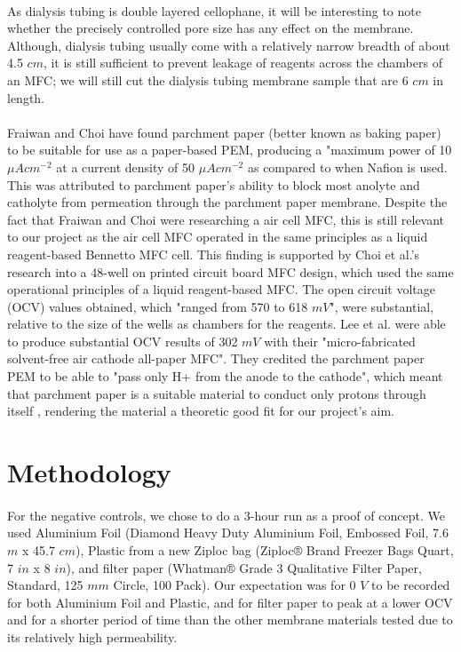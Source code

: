 \documentclass[12pt, twocolumn, a4paper]{article}
\begin{document}
    \paragraph{}As dialysis tubing is double layered cellophane, it will be interesting to note whether the precisely controlled pore size has any effect on the membrane. Although, dialysis tubing usually come with a relatively narrow breadth of about 4.5 $cm$, it is still sufficient to prevent leakage of reagents across the chambers of an MFC; we will still cut the dialysis tubing membrane sample that are 6 $cm$ in length.

   \paragraph{}Fraiwan and Choi \cite{C4CP04804K} have found parchment paper (better known as baking paper) to be suitable for use as a paper-based PEM, producing a "maximum power of 10 $\mu A cm^{-2}$ at a current density of 50 $\mu A cm^{-2}$ as compared to when Nafion is used.  This was attributed to parchment paper's ability to block most anolyte and catholyte from permeation through the parchment paper membrane. Despite the fact that Fraiwan and Choi were researching a air cell MFC, this is still relevant to our project as the air cell MFC operated in the same principles as a liquid reagent-based Bennetto MFC cell. This finding is supported by Choi et al.'s \cite{C5AN00492F} research into a 48-well on printed circuit board MFC design, which used the same operational principles of a liquid reagent-based MFC. The open circuit voltage (OCV) values obtained, which "ranged from 570 to 618 $mV$", were substantial, relative to the size of the wells as chambers for the reagents. Lee et al. \cite{Lee2016-xq} were able to produce substantial OCV results of 302 $mV$ with their "micro-fabricated solvent-free air cathode all-paper MFC". They credited the parchment paper PEM to be able to "pass only H+ from the anode to the cathode", which meant that parchment paper is a suitable material to conduct only protons through itself \cite{doi:10.1021/acs.chemrev.6b00159}, rendering the material a theoretic good fit for our project's aim. 
\section{Methodology}
\paragraph{}For the negative controls, we chose to do a 3-hour run as a proof of concept. We used Aluminium Foil (Diamond Heavy Duty Aluminium Foil, Embossed Foil, 7.6 $m$ x 45.7 $cm$), Plastic from a new Ziploc bag (Ziploc® Brand Freezer Bags Quart, 7 $in$ x 8 $in$), and filter paper (Whatman® Grade 3 Qualitative Filter Paper, Standard, 125 $mm$ Circle, 100 Pack). Our expectation was for 0 $V$ to be recorded for both Aluminium Foil and Plastic, and for filter paper to peak at a lower OCV and for a shorter period of time than the other membrane materials tested due to its relatively high permeability.
\end{document}

